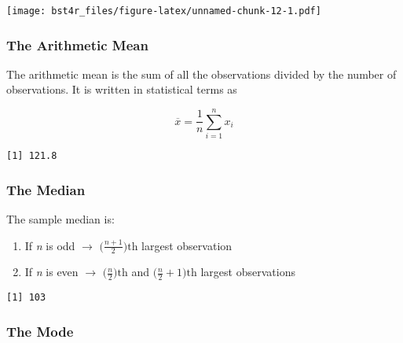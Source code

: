 \documentclass[12pt,]{article}
\newenvironment{Shaded}{\begin{snugshade}}{\end{snugshade}}
\newcommand{\KeywordTok}[1]{\textcolor[rgb]{0.13,0.29,0.53}{\textbf{#1}}}
\newcommand{\NormalTok}[1]{#1}
\newcommand{\OperatorTok}[1]{\textcolor[rgb]{0.81,0.36,0.00}{\textbf{#1}}}
\begin{document}
\texttt{[image: bst4r\_files/figure-latex/unnamed-chunk-12-1.pdf]}

\hypertarget{the-arithmetic-mean}{%
\subsubsection{The Arithmetic Mean}\label{the-arithmetic-mean}}

The arithmetic mean is the sum of all the observations divided by the
number of observations. It is written in statistical terms as

\[\overline{x} = \frac{1}{n}\sum^n_{i=1}x_i\]

\begin{Shaded}
\end{Shaded}

\begin{verbatim}
[1] 121.8
\end{verbatim}

\hypertarget{the-median}{%
\subsubsection{The Median}\label{the-median}}

The sample median is:

\begin{enumerate}
\def\labelenumi{\arabic{enumi}.}
\item
  If \emph{n} is odd \(\rightarrow\)
  \(\Big(\frac{n+1}{2}\Big)\text{th}\) largest observation
\item
  If \emph{n} is even \(\rightarrow\) \(\Big(\frac{n}{2}\Big)\text{th}\)
  and \(\Big(\frac{n}{2}+1\Big)\text{th}\) largest observations
\end{enumerate}

\begin{Shaded}
\end{Shaded}

\begin{verbatim}
[1] 103
\end{verbatim}

\hypertarget{the-mode}{%
\subsubsection{The Mode}\label{the-mode}}
\end{document}
